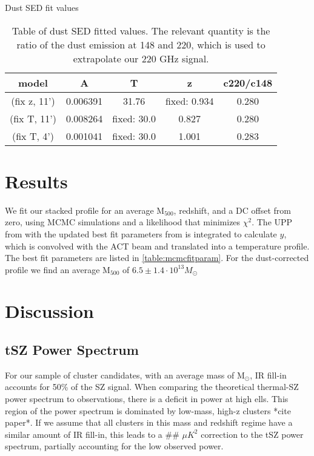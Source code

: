 \documentclass[twocolumn,iop]{emulateapj}
\begin{document}
\begin{table}
\caption{Dust SED fit values}
\label{table:dustfitparam}
\begin{tabular}{| c || c | c | c | c |}
\hline 
model & A & T & z & c220/c148 \\ \hline \hline
(fix z, 11') & 0.006391  & 31.76 & fixed: 0.934 & 0.280 \\ \hline
(fix T, 11') & 0.008264 & fixed: 30.0 & 0.827 & 0.280 \\ \hline
(fix T, 4') & 0.001041 & fixed: 30.0 & 1.001 & 0.283 \\
\hline
\end{tabular}
\caption{Table of dust SED fitted values. The relevant quantity is the ratio of the dust emission at 148 and 220, which is used to extrapolate our 220 GHz signal.}
\end{table}


\section{Results}

We fit our stacked profile for an average M$_{500}$, redshift, and a DC offset from zero, using MCMC simulations and a likelihood that minimizes $\chi^{2}$. The UPP from \cite{2010A&A...517A..92A} with the updated best fit parameters from \cite{2013A&A...550A.131P} is integrated to calculate $y$, which is convolved with the ACT beam and translated into a temperature profile. The best fit parameters are listed in \ref{table:mcmcfitparam}. For the dust-corrected profile we find an average M$_{500}$ of $6.5 \pm 1.4 \cdot 10^{13} M_{\odot}$



\section{Discussion}
\subsection{tSZ Power Spectrum}
For our sample of cluster candidates, with an average mass of M$_{\odot}$, IR fill-in accounts for 50\% of the SZ signal. When comparing the theoretical thermal-SZ power spectrum to observations, there is a deficit in power at high ells. This region of the power spectrum is dominated by low-mass, high-z clusters *cite paper*. If we assume that all clusters in this mass and redshift regime have a similar amount of IR fill-in, this leads to a \#\# $\mu K^{2}$ correction to the tSZ power spectrum, partially accounting for the low observed power. 
\end{document}
